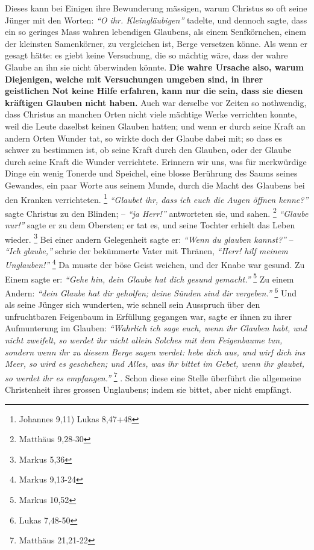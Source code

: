 Dieses kann bei Einigen ihre Bewunderung mässigen, warum Christus so oft seine
Jünger mit den Worten:
\textit{"`O ihr. Kleingläubigen"'} tadelte, und dennoch sagte,
dass ein so geringes Mass wahren lebendigen Glaubens, als einem Senfkörnchen,
einem der kleinsten Samenkörner, zu vergleichen ist, Berge versetzen könne. Als
wenn er gesagt hätte: es giebt keine Versuchung, die so mächtig wäre, dass der
wahre Glaube an ihn sie nicht überwinden könnte. \textbf{Die wahre Ursache also,
warum
Diejenigen, welche mit Versuchungen umgeben sind, in ihrer geistlichen Not
keine Hilfe erfahren, kann nur die sein, dass sie diesen kräftigen Glauben nicht
haben.} Auch war derselbe vor Zeiten so nothwendig,
dass Christus an manchen
Orten nicht viele mächtige Werke verrichten konnte, weil die Leute daselbst
keinen Glauben hatten; und wenn er durch seine Kraft an andern Orten Wunder
tat, so wirkte doch der Glaube dabei mit; so dass es schwer zu bestimmen ist,
ob seine Kraft durch den Glauben, oder der Glaube durch seine Kraft die Wunder
verrichtete. Erinnern wir uns, was für merkwürdige Dinge ein wenig Tonerde und
Speichel, eine blosse Berührung des Saums seines Gewandes, ein paar Worte aus
seinem Munde, durch die Macht des Glaubens bei den Kranken
verrichteten.
\footnote{Johannes 9,11) Lukas 8,47+48}
\textit{"`Glaubet ihr, dass ich euch die
Augen öffnen kenne?"'} sagte Christus zu den Blinden; -- \textit{"`ja Herr!"'}
antworteten
sie, und sahen.
\footnote{Matthäus 9,28-30}
\textit{"`Glaube nur!"'} sagte er zu dem
Obersten; er tat es, und seine Tochter erhielt das Leben wieder.
\footnote{Markus 5,36}
Bei einer andern Gelegenheit sagte er:
\textit{"`Wenn du glauben kannst?"'} --
\textit{"`Ich glaube,"'} schrie der bekümmerte Vater mit Thränen,
\textit{"`Herr! hilf meinem Unglauben!"'}
\footnote{Markus 9,13-24}
Da musste der böse Geist weichen, und der
Knabe war gesund. Zu Einem sagte er:
\textit{"`Gehe hin, dein Glaube hat dich gesund gemacht."'}
\footnote{Markus 10,52}
Zu einem Andern: \textit{"`dein Glaube hat dir
geholfen; deine Sünden sind dir vergeben."'}
\footnote{Lukas  7,48-50}
Und als seine
Jünger sich wunderten, wie schnell sein Ausspruch über den unfruchtbaren
Feigenbaum in Erfüllung gegangen war, sagte er ihnen zu ihrer Aufmunterung im
Glauben:
\textit{"`Wahrlich ich sage euch, wenn ihr Glauben habt, und nicht zweifelt,
so werdet ihr nicht allein Solches mit dem Feigenbaume tun, sondern wenn ihr zu
diesem Berge sagen werdet: hebe dich aus, und wirf dich ins Meer, so wird es
geschehen; und Alles, was ihr bittet im Gebet, wenn ihr glaubet, so werdet ihr
es empfangen."'}
\footnote{Matthäus 21,21-22}
. Schon diese eine Stelle überführt die allgemeine Christenheit ihres grossen
Unglaubens; indem sie bittet, aber nicht
empfängt.

